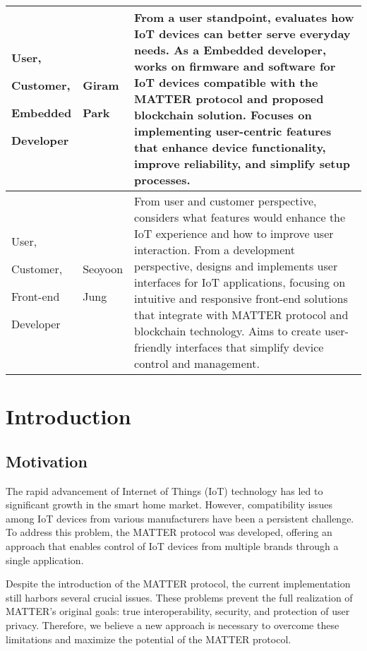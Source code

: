 \documentclass[conference]{IEEEtran}
\begin{document}
\begin{table}
\def\arraystretch{1.24} \small
    \begin{tabular}{|p{1.8cm}|p{1.4cm}|p{4.4cm}|}
        \hline
        User, \par Customer, \par Embedded \par Developer & Giram \par Park & From a user standpoint, evaluates how IoT devices can better serve everyday needs. As a Embedded developer, works on firmware and software for IoT devices compatible with the MATTER protocol and proposed blockchain solution. Focuses on implementing user-centric features that enhance device functionality, improve reliability, and simplify setup processes.\\ \hline
        
        User, \par Customer, \par Front-end \par Developer & Seoyoon \par Jung & From user and customer perspective, considers what features would enhance the IoT experience and how to improve user interaction. From a development perspective, designs and implements user interfaces for IoT applications, focusing on intuitive and responsive front-end solutions that integrate with MATTER protocol and blockchain technology. Aims to create user-friendly interfaces that simplify device control and management.\\ \hline
    \end{tabular}
\end{table}

\section{Introduction}

\subsection{Motivation}
The rapid advancement of Internet of Things (IoT) technology has led to significant growth in the smart home market. However, compatibility issues among IoT devices from various manufacturers have been a persistent challenge. To address this problem, the MATTER protocol was developed, offering an approach that enables control of IoT devices from multiple brands through a single application.

Despite the introduction of the MATTER protocol, the current implementation still harbors several crucial issues. These problems prevent the full realization of MATTER's original goals: true interoperability, security, and protection of user privacy. Therefore, we believe a new approach is necessary to overcome these limitations and maximize the potential of the MATTER protocol.
\end{document}
